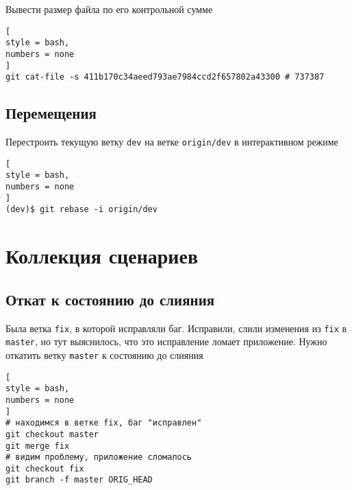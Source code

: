 \documentclass[%
	11pt,
	a4paper,
	utf8,
		]{article}
\begin{document}
Вывести размер файла по его контрольной сумме
\begin{lstlisting}[
style = bash,
numbers = none
]
git cat-file -s 411b170c34aeed793ae7984ccd2f657802a43300 # 737387
\end{lstlisting}

\subsection{Перемещения}

Перестроить текущую ветку \texttt{dev} на ветке \texttt{origin/dev} в интерактивном режиме
\begin{lstlisting}[
style = bash,
numbers = none
]
(dev)$ git rebase -i origin/dev
\end{lstlisting}

\section{Коллекция сценариев}

\subsection{Откат к состоянию до слияния}

Была ветка \texttt{fix}, в которой исправляли баг. Исправили, слили изменения из \texttt{fix} в \texttt{master}, но тут выяснилось, что это исправление ломает приложение. Нужно откатить ветку \texttt{master} к состоянию до слияния
\begin{lstlisting}[
style = bash,
numbers = none
]
# находимся в ветке fix, баг "исправлен"
git checkout master
git merge fix
# видим проблему, приложение сломалось
git checkout fix
git branch -f master ORIG_HEAD
\end{lstlisting}


\begin{thebibliography}{99}
	
\end{thebibliography}

\end{document}

